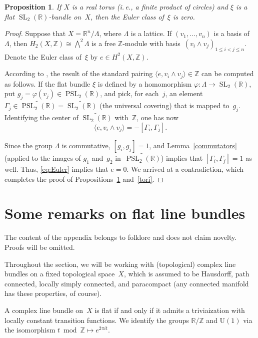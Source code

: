 \documentclass[11pt]{amsart}
\newcommand*{\R}{{\mathbb R}}
\newcommand*{\Z}{{\mathbb Z}}
\newcommand*{\uPSL}{{\widetilde{\PSL_2(\R)}}}
\DeclareMathOperator{\PSL}{PSL}
\DeclareMathOperator{\SL}{SL}
\let\ph\varphi
\newtheorem{proposition}{Proposition}[section]
\theoremstyle{remark}
\theoremstyle{definition}
\begin{document}
\begin{proposition}\label{on_torus}
If $X$ is a real torus \textup(i.\,e., a finite product of
circles\textup) and $\xi$ is a flat $\SL_2(\R)$-bundle on~$X$, then the
Euler class of~$\xi$ is zero.
\end{proposition}

\begin{proof}
Suppose that $X=\R^n/\Lambda$, where $\Lambda$ is a lattice. If
$(v_1,\dots,v_n)$ is a basis of~$\Lambda$, then
$H_2(X,\Z)\cong\bigwedge^2\Lambda$ is a free $\Z$-module with
basis~$(v_i\wedge v_j)_{1\le i<j\le n}$. Denote the Euler class
of~$\xi$ by $e\in H^2(X,\Z)$.

According to \cite[Lemma 2]{Milnor}, the result
of the standard pairing $\langle e, v_i\wedge v_j\rangle\in\Z$ can
be computed as follows. If the flat
bundle $\xi$ is defined by a homomorphism $\ph\colon
\Lambda\to \SL_2(\R)$, put $g_j=\ph(v_j)\in\PSL_2(\R)$, and pick, for
each~$j$, an element $\Gamma_j\in\uPSL=\widetilde{\SL_2(\R)}$ (the
universal covering) that 
is mapped to~$g_j$. Identifying the center of
$\widetilde{\SL_2(\R)}$ with~$\Z$, one has now
\begin{equation}\label{eq:Euler}
\langle e, v_i\wedge v_j\rangle=-[\Gamma_i,\Gamma_j].  
\end{equation}

 Since the group $\Lambda$ is
commutative, $[g_i,g_j]=1$, and Lemma~\ref{commutators} (applied to
the images of $g_1$ and~$g_2$ in~$\uPSL$) implies that
$[\Gamma_i,\Gamma_j]=1$ as well. Thus, \eqref{eq:Euler} implies that
$e=0$. We arrived at a contradiction, which completes the proof of
Propositions~\ref{on_torus} and~\ref{tori}. 
\end{proof}

\appendix

\section{Some remarks on flat line bundles}

The content of the appendix belongs to folklore and does not claim
novelty. Proofs will be omitted.

Throughout the section, we will be working with (topological) complex
line bundles on a fixed topological space~$X$, which is assumed to be
Hausdorff, path connected, locally simply connected, and paracompact
(any connected manifold has these properties, of course).

A complex line bundle on~$X$ is flat if and only if it admits a
triviaization with locally constant transition functions. We identify
the groups $\R/\Z$ and $\mathrm U(1)$ via the isomorphism $t\bmod
\Z\mapsto e^{2\pi it}$.
\end{document}
